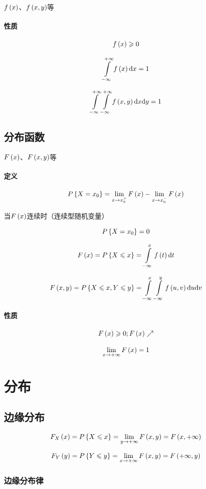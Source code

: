\documentclass{article}
\begin{document}
$f\left(x\right)$、$f\left(x,y\right)$等

\paragraph{性质}

\[f\left(x\right)\geqslant0\]

\[\int\limits_{-\infty}^{+\infty} f\left(x\right)\mathrm d x=1\]

\[\int\limits_{-\infty}^{+\infty}\int\limits_{-\infty}^{+\infty} f\left(x,y\right)\mathrm d x\mathrm d y=1\]

\subsection{分布函数}

$F\left(x\right)$、$F\left(x,y\right)$等

\paragraph{定义}

\[P\left\{X=x_0\right\}=\lim_{x\to x_0^+}F\left(x\right)-\lim_{x\to x_0^-}F\left(x\right)\]

当$F\left(x\right)$连续时（连续型随机变量）

\[P\left\{X=x_0\right\}=0\]

\[F\left(x\right)=P\left\{X\leqslant x\right\}=\int\limits_{-\infty}^xf\left(t\right)\mathrm d t\]

\[F\left(x,y\right)=P\left\{X\leqslant x,Y\leqslant y\right\}=\int\limits_{-\infty}^x\int\limits_{-\infty}^yf\left(u,v\right)\mathrm d u\mathrm d v\]

\paragraph{性质}

\[F\left(x\right)\geqslant0;F\left(x\right)\nearrow\]

\[\lim_{x\to+\infty}F\left(x\right)=1\]

\section{分布}

\subsection{边缘分布}

\[F_X\left(x\right)=P\left\{X\leqslant x\right\}=\lim_{y\to+\infty}F\left(x,y\right)=F\left(x,+\infty\right)\]

\[F_Y\left(y\right)=P\left\{Y\leqslant y\right\}=\lim_{x\to+\infty}F\left(x,y\right)=F\left(+\infty,y\right)\]

\subsubsection{边缘分布律}
\end{document}
